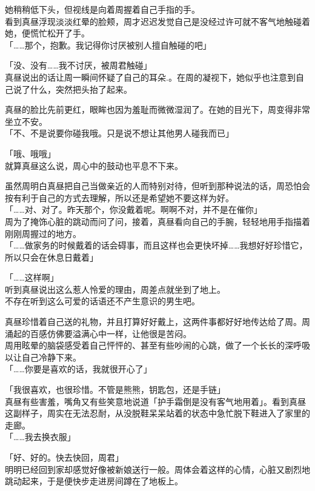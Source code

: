 她稍稍低下头，但视线是向着周握着自己手指的手。\\

看到真昼浮现淡淡红晕的脸颊，周才迟迟发觉自己是没经过许可就不客气地触碰着她，便慌忙松开了手。\\

「……那个，抱歉。我记得你讨厌被别人擅自触碰的吧」

「没、没有……我不讨厌，被周君触碰」\\

真昼说出的话让周一瞬间怀疑了自己的耳朵.。在周的凝视下，她似乎也注意到自己说了什么，突然把头抬了起来。

真昼的脸比先前更红，眼眸也因为羞耻而微微湿润了。在她的目光下，周变得非常坐立不安。\\

「不、不是说要你碰我哦。只是说不想让其他男人碰我而已」

「哦、哦哦」\\

就算真昼这么说，周心中的鼓动也平息不下来。

虽然周明白真昼把自己当做亲近的人而特别对待，但听到那种说法的话，周恐怕会按有利于自己的方式去理解，所以还是希望她不要这样为好。\\

「……对、对了。昨天那个，你没戴着呢。啊啊不对，并不是在催你」\\

周为了掩饰心脏的跳动而问了问，接着，真昼看向自己的手腕，轻轻地用手指描着刚刚周握过的地方。\\

「……做家务的时候戴着的话会碍事，而且这样也会更快坏掉……我想好好珍惜它，所以只会在休息日戴着」

「……这样啊」\\

听到真昼说出这么惹人怜爱的理由，周差点就坐到了地上。\\

不存在听到这么可爱的话语还不产生意识的男生吧。

真昼珍惜着自己送的礼物，并且打算好好戴上，这两件事都好好地传达给了周。周涌起的百感仿佛要溢满心中一样，让他很是苦闷。\\

周用眩晕的脑袋感受着自己怦怦的、甚至有些吵闹的心跳，做了一个长长的深呼吸以让自己冷静下来。\\

「……你要是喜欢的话，我就很开心了」

「我很喜欢，也很珍惜。不管是熊熊，钥匙包，还是手链」\\

真昼有些害羞，嘴角又有些笑意地说道「护手霜倒是没有客气地用着」。看到真昼这副样子，周实在无法忍耐，从没脱鞋呆呆站着的状态中急忙脱下鞋进入了家里的走廊。\\

「……我去换衣服」

「好、好的。快去快回，周君」\\

明明已经回到家却感觉好像被新娘送行一般。周体会着这样的心情，心脏又剧烈地跳动起来，于是便快步走进房间蹲在了地板上。

